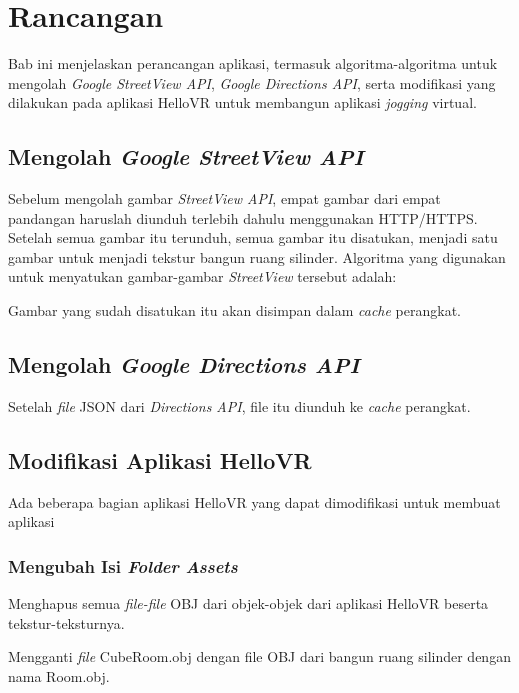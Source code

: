 \chapter{Rancangan}
\label{chap:rancangan}
Bab ini menjelaskan perancangan aplikasi, termasuk algoritma-algoritma untuk mengolah \textit{Google StreetView API}, \textit{Google Directions API}, serta modifikasi yang dilakukan pada aplikasi HelloVR untuk membangun aplikasi \textit{jogging} virtual. 


\section{Mengolah \textit{Google StreetView API}} 

Sebelum mengolah gambar \textit{StreetView API}, empat gambar dari empat pandangan haruslah diunduh terlebih dahulu menggunakan HTTP/HTTPS. Setelah semua gambar itu terunduh, semua gambar itu disatukan, menjadi satu gambar untuk menjadi tekstur bangun ruang silinder. Algoritma yang digunakan untuk menyatukan gambar-gambar \textit{StreetView} tersebut adalah:

Gambar yang sudah disatukan itu akan disimpan dalam \textit{cache} perangkat. 

\section{Mengolah \textit{Google Directions API}}

Setelah \textit{file} JSON dari \textit{Directions API}, file itu diunduh ke \textit{cache} perangkat.  





\section{Modifikasi Aplikasi HelloVR}

Ada beberapa bagian aplikasi HelloVR yang dapat dimodifikasi untuk membuat aplikasi

\subsection{Mengubah Isi \textit{Folder Assets}}
Menghapus semua \textit{file-file} OBJ dari objek-objek dari aplikasi HelloVR beserta tekstur-teksturnya. 

Mengganti \textit{file} CubeRoom.obj dengan file OBJ dari bangun ruang silinder dengan nama Room.obj.

